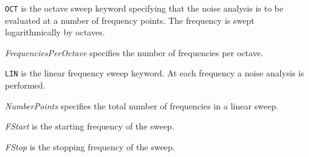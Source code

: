 \begin{widelist}
\item[{\tt OCT}] is the octave sweep keyword specifying that the
     noise analysis is to be evaluated at a number of frequency points.
     The frequency is swept logarithmically by octaves.

\item[{\it FrequenciesPerOctave}]
     specifies the number of frequencies per octave.

\item[{\tt LIN}] is the linear frequency sweep keyword. At each frequency a
     noise analysis is performed.

\item[{\it NumberPoints}]
     specifies the total number of frequencies in a linear sweep.

\item[{\it FStart}]
     is the starting frequency of the sweep.

\item[{\it FStop}]
     is the stopping frequency of the sweep.

\end{widelist}





